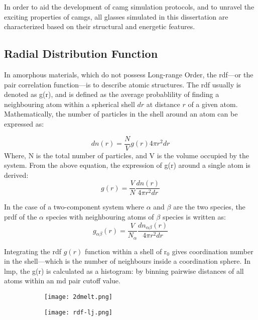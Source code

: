 In order to aid the development of \gls{camg} simulation protocols, and to unravel the exciting properties of \gls{camg}s, all glasses simulated in this dissertation are characterized based on their structural and energetic features. \par %

\subsection{Radial Distribution Function} \label{s:rdf}
In amorphous materials, which do not possess Long-range Order, the \gls{rdf}---or the pair correlation function---is to describe atomic structures. The \gls{rdf} usually is denoted as g(r), and is defined as the average probablility of finding a neighbouring atom within a spherical shell $dr$ at distance $r$ of a given atom. Mathematically, the number of particles in the shell around an atom can be expressed as:

\begin{equation}
dn(r) = \frac{N}{V} g(r) 4\pi r^2dr
\end{equation}
Where, N is the total number of particles, and V is the volume occupied by the system. From the above equation, the expression of g(r) around a single atom is derived:
\begin{equation}
g(r) = \frac{V}{N} \frac{dn(r)}{4 \pi r^{2}dr}
\end{equation}

In the case of a two-component system where $\alpha$ and $\beta$ are the two species, the \gls{prdf} of the $\alpha$ species with neighbouring atoms of $\beta$ species is written as: 
\begin{equation}
g_{\alpha \beta}(r) = \frac{V}{N_\alpha} \frac{dn_{\alpha \beta}(r)}{4 \pi r^{2}dr}
\end{equation}

Integrating the \gls{rdf} $g(r)$ function within a shell of r$_0$ gives coordination number in the shell---which is the number of neighbours inside a coordination sphere. In \gls{lmp}, the g(r) is calculated as a histogram: by binning pairwise distances of all atoms within an \gls{md} pair cutoff value. \par

\begin{figure}[h]
	\begin{subfigure}{0.5\textwidth} \centering
		\texttt{[image: 2dmelt.png]}
		\subcaption{}
	\end{subfigure}%
	\hfill
	\begin{subfigure}{0.5\textwidth} \centering
		\texttt{[image: rdf-lj.png]}
		\subcaption{}
	\end{subfigure}%
	\label{f:ljrdf}
\end{figure}

